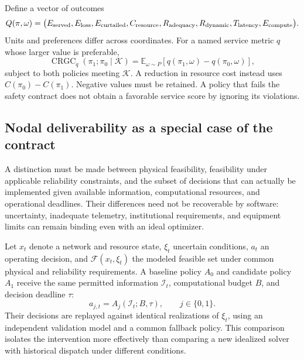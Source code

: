 \documentclass[11pt,letterpaper]{article}
\newcommand{\E}{\mathbb E}\newcommand{\R}{\mathbb R}\newcommand{\CRGC}{\operatorname{CRGC}}
\begin{document}
Define a vector of outcomes
\[
 Q(\pi,\omega)=
 \big(E_{\rm served},E_{\rm loss},E_{\rm curtailed},
 C_{\rm resource},R_{\rm adequacy},R_{\rm dynamic},
 T_{\rm latency},E_{\rm compute}\big).
\]
Units and preferences differ across coordinates. For a named service metric $q$ whose larger value is preferable,
\begin{equation}
 \CRGC_q(\pi_1;\pi_0\mid\mathcal K)
  =\E_{\omega\sim P}\!\left[q(\pi_1,\omega)-q(\pi_0,\omega)\right],
 \label{eq:crgc}
\end{equation}
subject to both policies meeting $\mathcal K$. A reduction in resource cost instead uses $C(\pi_0)-C(\pi_1)$. Negative values must be retained. A policy that fails the safety contract does not obtain a favorable service score by ignoring its violations.

\subsection{Nodal deliverability as a special case of the contract}
A distinction must be made between physical feasibility, feasibility under applicable reliability constraints, and the subset of decisions that can actually be implemented given available information, computational resources, and operational deadlines. Their differences need not be recoverable by software: uncertainty, inadequate telemetry, institutional requirements, and equipment limits can remain binding even with an ideal optimizer.

Let $x_t$ denote a network and resource state, $\xi_t$ uncertain conditions, $a_t$ an operating decision, and $\mathcal{F}(x_t,\xi_t)$ the modeled feasible set under common physical and reliability requirements. A baseline policy $A_0$ and candidate policy $A_1$ receive the same permitted information $\mathcal{I}_t$, computational budget $B$, and decision deadline $\tau$:
\begin{equation}
a_{j,t}=A_j(\mathcal{I}_t;B,\tau),\qquad j\in\{0,1\}.
\label{eq:policy}
\end{equation}
Their decisions are replayed against identical realizations of $\xi_t$, using an independent validation model and a common fallback policy. This comparison isolates the intervention more effectively than comparing a new idealized solver with historical dispatch under different conditions.
\end{document}

